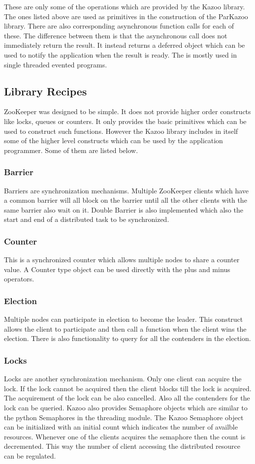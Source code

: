   These are only some of the operations which are provided by the Kazoo library. The ones listed above are used as primitives in the construction of the ParKazoo library. There are also corresponding asynchronous function calls for each of these. The difference between them is that the asynchronous call does not immediately return the result. It instead returns a deferred object which can be used to notify the application when the result is ready. The is mostly used in single threaded evented programs.
  
\subsection{Library Recipes}
  ZooKeeper was designed to be simple. It does not provide higher order constructs like locks, queues or counters. It only provides the basic primitives which can be used to construct such functions. However the Kazoo library includes in itself some of the higher level constructs which can be used by the application programmer. Some of them are listed below.
  \subsubsection{Barrier}
    Barriers are synchronization mechanisms. Multiple ZooKeeper clients which have a common barrier will all block on the barrier until all the other clients with the same barrier also wait on it. Double Barrier is also implemented which also the start and end of a distributed task to be synchronized.
  \subsubsection{Counter}
  This is a synchronized counter which allows multiple nodes to share a counter value. A Counter type object can be used directly with the plus and minus operators.
  \subsubsection{Election}
  Multiple nodes can participate in election to become the leader. This construct allows the client to participate and then call a function when the client wins the election. There is also functionality to query for all the contenders in the election.
  \subsubsection{Locks}
    Locks are another synchronization mechanism. Only one client can acquire the lock. If the lock cannot be acquired then the client blocks till the lock is acquired. The acquirement of the lock can be also cancelled. Also all the contenders for the lock can be queried. Kazoo also provides Semaphore objects which are similar to the python Semaphores in the threading module. The Kazoo Semaphore object can be initialized with an initial count which indicates the number of availble resources. Whenever one of the clients acquires the semaphore then the count is decremented. This way the number of client accessing the distributed resource can be regulated.
